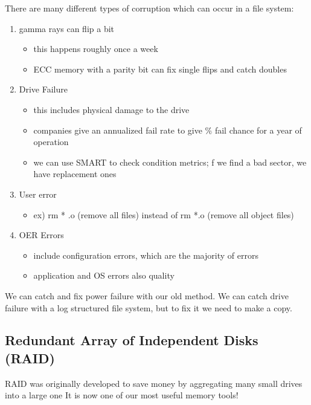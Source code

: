 \documentclass[../../lecture_notes.tex]{subfiles}
\begin{document}
There are many different types of corruption which can occur in a file system:
\begin{enumerate}
\item gamma rays can flip a bit
	\begin{itemize}
		\item this happens roughly once a week
		\item ECC memory with a parity bit can fix single flips and catch doubles
	\end{itemize}
\item Drive Failure 
	\begin{itemize}
		\item this includes physical damage to the drive
		\item companies give an annualized fail rate to give \% fail chance for a year of operation
		\item we can use SMART to check condition metrics; f we find a bad sector, we have replacement ones
	\end{itemize}
\item User error
	\begin{itemize}
		\item ex) rm * .o (remove all files) instead of rm *.o  (remove all object files)
	\end{itemize}
\item OER Errors
	\begin{itemize}
		\item include configuration errors, which are the majority of errors
		\item application and OS errors also quality
	\end{itemize}
\end{enumerate}

We can catch and fix power failure with our old method. We can catch drive failure with a log structured file system, but to fix it we need to make a copy.


\subsection{Redundant Array of Independent Disks (RAID)}

RAID was originally developed to save money by aggregating many small drives into a large one
It is now one of our most useful memory tools!

\ifdim\pgfmathresult pt=0pt %
  \tikzset{declare function={atanXY(\x,\y)=atan2(\y,\x);atanYX(\y,\x)=atan2(\y,\x);}}
\else                       %
  \tikzset{declare function={atanXY(\x,\y)=atan2(\x,\y);atanYX(\y,\x)=atan2(\x,\y);}}
\fi
\end{document}
